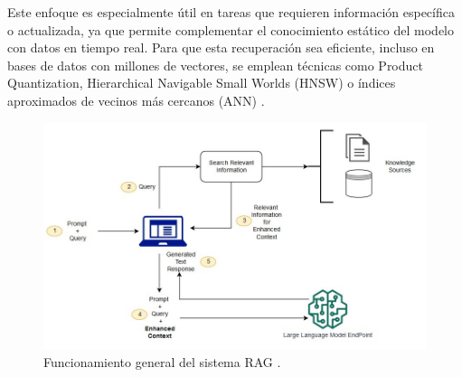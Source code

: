 \documentclass[../main.tex]{subfiles}
\begin{document}
Este enfoque es especialmente útil en tareas que requieren información específica o actualizada, ya que permite complementar el conocimiento estático del modelo con datos en tiempo real. Para que esta recuperación sea eficiente, incluso en bases de datos con millones de vectores, se emplean técnicas como Product Quantization, Hierarchical Navigable Small Worlds (HNSW) o índices aproximados de vecinos más cercanos (ANN) \parencite{lewis2020retrieval}.

\begin{figure}[H]
	\centering
	\includegraphics[width=\textwidth]{images/rag_aws.jpg}
	\caption{Funcionamiento general del sistema RAG \parencite{awsRAG}.}
	\label{fig:rag_diagrama}
\end{figure}
\end{document}
